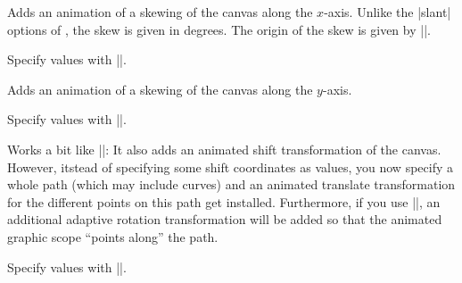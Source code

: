 \begin{command}{\pgfsys@animateskewx}
  Adds an animation of a skewing of the canvas along the
  $x$-axis. Unlike the |slant| options of \tikzname, the skew is given
  in degrees. The origin of the skew is given by |\pgfsys@animation@origin|.
  
  Specify values with |\pgfsys@animation@scalar|.
\begin{codeexample}[width=2cm]
\end{codeexample}
\end{command}

\begin{command}{\pgfsys@animateskewy}
  Adds an animation of a skewing of the canvas along the $y$-axis.
  
  Specify values with |\pgfsys@animation@scalar|.
\end{command}

\begin{command}{\pgfsys@animatemotion}
  Works a bit like |\pgfsys@animation@translate|: It also adds an
  animated shift transformation of the canvas. However, itstead of
  specifying some shift coordinates as values, you now specify a whole
  path (which may include curves) and an animated translate
  transformation for the different points on this path get installed.
  Furthermore, if you use |\pgfsys@animation@rotatealong|, an
  additional adaptive rotation transformation will be added so that
  the animated graphic scope ``points along'' the path.
  
  Specify values with |\pgfsys@animation@movealong|.
\begin{codeexample}[width=2cm]
\end{codeexample}
\begin{codeexample}[width=2cm]
\end{codeexample}
\end{command}



